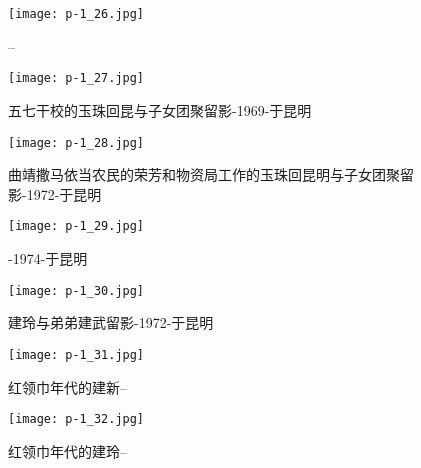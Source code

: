 \begin{figure}
    \begin{center}
        \texttt{[image: p-1\_26.jpg]}
        \caption{--}
    \end{center}
\end{figure}

\clearpage


\begin{figure}
    \begin{center}
        \texttt{[image: p-1\_27.jpg]}
        \caption{五七干校的玉珠回昆与子女团聚留影-1969-于昆明}
    \end{center}
\end{figure}

\clearpage


\begin{figure}
    \begin{center}
        \texttt{[image: p-1\_28.jpg]}
        \caption{曲靖撒马依当农民的荣芳和物资局工作的玉珠回昆明与子女团聚留影-1972-于昆明}
    \end{center}
\end{figure}

\clearpage


\begin{figure}
    \begin{center}
        \texttt{[image: p-1\_29.jpg]}
        \caption{-1974-于昆明}
    \end{center}
\end{figure}

\clearpage


\begin{figure}
    \begin{center}
        \texttt{[image: p-1\_30.jpg]}
        \caption{建玲与弟弟建武留影-1972-于昆明}
    \end{center}
\end{figure}

\clearpage


\begin{figure}
    \begin{center}
        \texttt{[image: p-1\_31.jpg]}
        \caption{红领巾年代的建新--}
    \end{center}
\end{figure}

\clearpage


\begin{figure}
    \begin{center}
        \texttt{[image: p-1\_32.jpg]}
        \caption{红领巾年代的建玲--}
    \end{center}
\end{figure}

